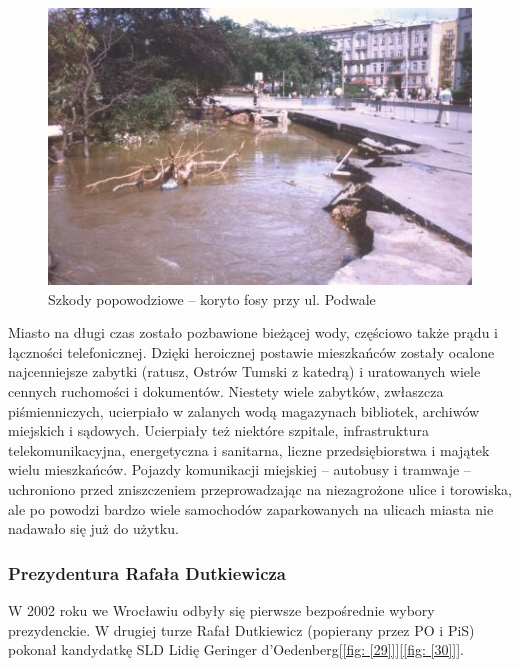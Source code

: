 \documentclass{article}
\begin{document}
\begin{center}
\begin{figure}[h]
	\centering
	\includegraphics[scale=0.9]{Podówdz.png}
	\caption{Szkody popowodziowe – koryto fosy przy ul. Podwale}
\end{figure}
\end{center}

 Miasto na długi czas zostało pozbawione bieżącej wody, częściowo także prądu i łączności telefonicznej. Dzięki heroicznej postawie mieszkańców zostały ocalone najcenniejsze zabytki (ratusz, Ostrów Tumski z katedrą) i uratowanych wiele cennych ruchomości i dokumentów. Niestety wiele zabytków, zwłaszcza piśmienniczych, ucierpiało w zalanych wodą magazynach bibliotek, archiwów miejskich i sądowych. Ucierpiały też niektóre szpitale, infrastruktura telekomunikacyjna, energetyczna i sanitarna, liczne przedsiębiorstwa i majątek wielu mieszkańców. Pojazdy komunikacji miejskiej – autobusy i tramwaje – uchroniono przed zniszczeniem przeprowadzając na niezagrożone ulice i torowiska, ale po powodzi bardzo wiele samochodów zaparkowanych na ulicach miasta nie nadawało się już do użytku.
 
 
\subsubsection {Prezydentura Rafała Dutkiewicza}

W 2002 roku we Wrocławiu odbyły się pierwsze bezpośrednie wybory prezydenckie. W drugiej turze Rafał Dutkiewicz (popierany przez PO i PiS) pokonał kandydatkę SLD Lidię Geringer d’Oedenberg[\ref{fig: [29]}][\ref{fig: [30]}].
\end{document}
